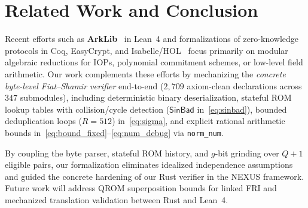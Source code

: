 \documentclass[conference]{IEEEtran}
\theoremstyle{definition}
\begin{document}
\section{Related Work and Conclusion}
\label{sec:related}

Recent efforts such as \textbf{ArkLib}~\cite{arklib2024} in Lean~4 and formalizations of zero-knowledge protocols in Coq, EasyCrypt, and Isabelle/HOL~\cite{barthe2011certicrypt,lochbihler2019crypthol,erbsen2019simple,zinzindohoue2017hacl,almeida2017jasmin,goldberg2021cairo} focus primarily on modular algebraic reductions for IOPs, polynomial commitment schemes, or low-level field arithmetic. Our work complements these efforts by mechanizing the \emph{concrete byte-level Fiat--Shamir verifier} end-to-end ($2{,}709$ axiom-clean declarations across $347$ submodules), including deterministic binary deserialization, stateful ROM lookup tables with collision/cycle detection ($\mathsf{SinBad}$ in~\eqref{eq:sinbad}), bounded deduplication loops ($R = 512$) in~\eqref{eq:sigma}, and explicit rational arithmetic bounds in~\eqref{eq:bound_fixed}--\eqref{eq:num_debug} via \texttt{norm\_num}.

By coupling the byte parser, stateful ROM history, and $g$-bit grinding over $Q + 1$ eligible pairs, our formalization eliminates idealized independence assumptions and guided the concrete hardening of our Rust verifier in the NEXUS framework. Future work will address QROM superposition bounds for linked FRI and mechanized translation validation between Rust and Lean~4.
\end{document}
